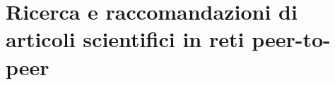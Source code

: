 \thispagestyle{empty}
\part*{Ricerca e raccomandazioni di articoli scientifici in reti peer-to-peer}


\renewcommand{\thetool}{\Roman{tool}}
\let\myChapter\thechapter

\newcommand{\tool}[1]{%
 \renewcommand{\chaptername}{Compendio}
 \stepcounter{tool}
 \setcounter{save}{\thechapter}
 \let\thechapter\thetool
 \renewcommand\theHchapter{Tool-\thechapter}
 \chapter{#1}
 \renewcommand{\chaptername}{Chapter}
 \let\thechapter\myChapter
 \setcounter{chapter}{\thesave}
 \renewcommand\theHchapter{\thechapter}
}

\newcommand{\sezione}[1]{%
 \def\thesection {\thetool.\arabic{section}}
 \section{#1}

 \def\thesection {\thechapter.\arabic{section}}
}

\newcommand{\subsezione}[1]{%
 \def\thesubsection {\thetool.\arabic{section}.\arabic{subsection}}%
 \subsection{#1}

 \def\thesubsection {\thechapter.\arabic{section}.\arabic{subsection}}
}

